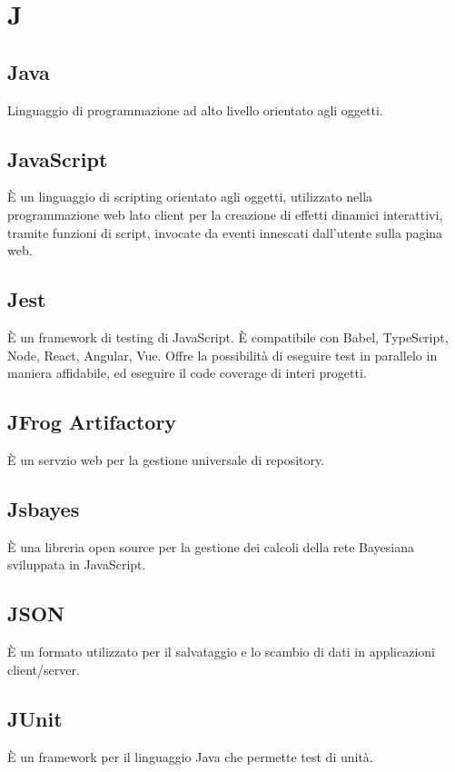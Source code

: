 \section*{J}

\subsection{Java}
Linguaggio di programmazione ad alto livello orientato agli oggetti. 

\subsection{JavaScript}
È un linguaggio di scripting orientato agli oggetti, utilizzato nella programmazione web lato client per la creazione di effetti dinamici interattivi, tramite funzioni di script, invocate da eventi innescati dall'utente sulla pagina web.

\subsection{Jest} 
È un framework di testing di JavaScript. È compatibile con Babel, TypeScript, Node, React, Angular, Vue. Offre la possibilità di eseguire test in parallelo in maniera affidabile, ed eseguire il code coverage di interi progetti.

\subsection{JFrog Artifactory} 
È un servzio web per la gestione universale di repository.

\subsection{Jsbayes}
È una libreria open source per la gestione dei calcoli della rete Bayesiana sviluppata in JavaScript.

\subsection{JSON}
È un formato utilizzato per il salvataggio e lo scambio di dati in applicazioni client/server.

\subsection{JUnit}
È un framework per il linguaggio Java che permette test di unità.
